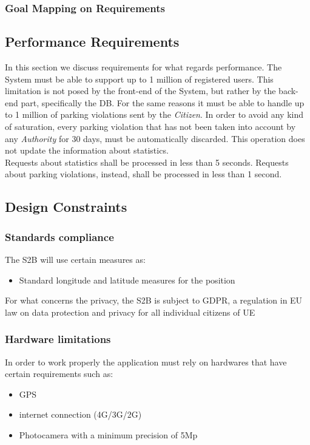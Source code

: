 \documentclass{article}
\begin{document}
\subsubsection{Goal Mapping on Requirements}

\subsection{Performance Requirements}
In this section we discuss requirements for what regards performance. The System must be able to support up to
1 million of registered users. This limitation is not posed by the front-end of the System, but rather by the 
back-end part, specifically the DB. For the same reasons it must be able to handle up to 1 million of parking violations 
sent by the \textit{Citizen}. In order to avoid any kind of saturation, every parking violation that has not been taken into account
 by any \textit{Authority} for 30 days, must be automatically discarded. This operation does not update the information about
 statistics.
 \\Requests about statistics shall be processed in less than 5 seconds. Requests about parking violations, instead, shall be processed 
 in less than 1 second.     

\subsection{Design Constraints}
\subsubsection{Standards compliance}
The S2B  will use certain measures as:
\begin{itemize}
    \item Standard longitude and latitude measures for the position
\end{itemize}
For what concerns the privacy, the S2B is subject to GDPR, a regulation in EU law on data protection 
and privacy for all individual citizens of UE  

\subsubsection{Hardware limitations}
In order to work properly the application must rely on hardwares that have certain requirements 
such as:
\begin{itemize}
    \item GPS
    \item internet connection (4G/3G/2G)
    \item Photocamera with a minimum precision of 5Mp 
\end{itemize}   
\end{document}
